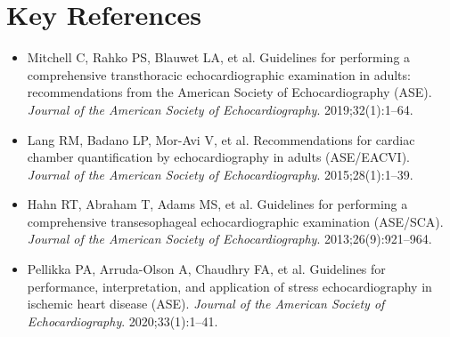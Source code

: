 \section{Key References}
\begin{itemize}
\item Mitchell C, Rahko PS, Blauwet LA, et al. Guidelines for performing a comprehensive transthoracic echocardiographic examination in adults: recommendations from the American Society of Echocardiography (ASE). \textit{Journal of the American Society of Echocardiography}. 2019;32(1):1--64.
\item Lang RM, Badano LP, Mor-Avi V, et al. Recommendations for cardiac chamber quantification by echocardiography in adults (ASE/EACVI). \textit{Journal of the American Society of Echocardiography}. 2015;28(1):1--39.
\item Hahn RT, Abraham T, Adams MS, et al. Guidelines for performing a comprehensive transesophageal echocardiographic examination (ASE/SCA). \textit{Journal of the American Society of Echocardiography}. 2013;26(9):921--964.
\item Pellikka PA, Arruda-Olson A, Chaudhry FA, et al. Guidelines for performance, interpretation, and application of stress echocardiography in ischemic heart disease (ASE). \textit{Journal of the American Society of Echocardiography}. 2020;33(1):1--41.
\end{itemize}
